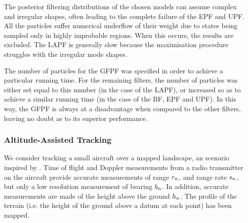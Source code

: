 \documentclass{article}
\begin{document}
The posterior filtering distributions of the chosen models can assume complex and irregular shapes, often leading to the complete failure of the EPF and UPF. All the particles suffer numerical underflow of their weight due to states being sampled only in highly improbable regions. When this occurs, the results are excluded. The LAPF is generally slow because the maximisation procedure struggles with the irregular mode shapes.

The number of particles for the GFPF was specified in order to achieve a particular running time. For the remaining filters, the number of particles was either set equal to this number (in the case of the LAPF), or increased so as to achieve a similar running time (in the case of the BF, EPF and UPF). In this way, the GFPF is always at a disadvantage when compared to the other filters, leaving no doubt as to its superior performance.

\subsubsection{Altitude-Assisted Tracking}
We consider tracking a small aircraft over a mapped landscape, an scenario inspired by \cite{Schon2005}. Time of flight and Doppler measurements from a radio transmitter on the aircraft provide accurate measurements of range $r_{n}$, and range rate $s_{n}$, but only a low resolution measurement of bearing $b_{n}$. In addition, accurate measurements are made of the height above the ground $h_{n}$. The profile of the terrain (i.e. the height of the ground above a datum at each point) has been mapped.
\end{document}
